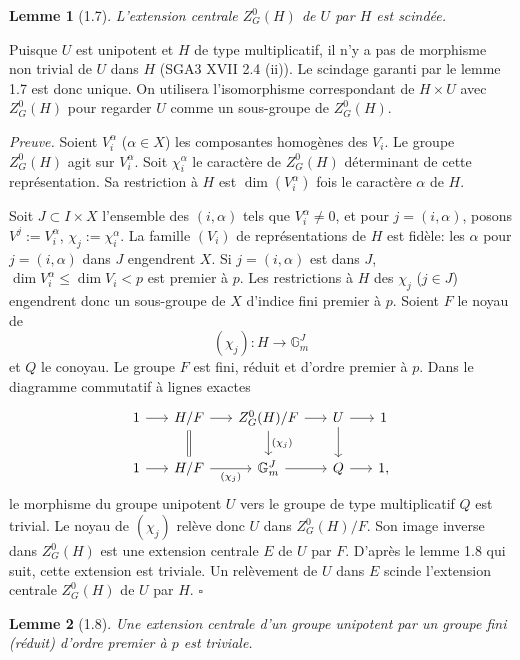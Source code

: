 \documentclass[10pt]{article}
\newcommand{\Gm}{\mathbb G_m}
\theoremstyle{deligne}
\newtheorem*{lemma*}{Lemme}
\newenvironment{proofdel}{\textit{Preuve.}}{\hfill$\square$}
\begin{document}
\begin{lemma*}[1.7]
L'extension centrale \(Z^0_G(H)\) de \(U\) par \(H\) est scindée.
\end{lemma*}

Puisque \(U\) est unipotent et \(H\) de type multiplicatif, il n'y a pas de morphisme non trivial de \(U\) dans \(H\) (SGA3 XVII 2.4 (ii)). Le scindage garanti par le lemme 1.7 est donc unique. On utilisera l'isomorphisme correspondant de \(H\times U\) avec \(Z^0_G(H)\) pour regarder \(U\) comme un sous-groupe de \(Z^0_G(H)\).

\begin{proofdel}
Soient \(V^\alpha_i\) (\(\alpha\in X\)) les composantes homogènes des \(V_i\). Le groupe \(Z^0_G(H)\) agit sur \(V^\alpha_i\). Soit \(\chi^\alpha_i\) le caractère de \(Z^0_G(H)\) déterminant de cette représentation. Sa restriction à \(H\) est \(\dim(V^\alpha_i)\) fois le caractère \(\alpha\) de \(H\).

Soit \(J\subset I\times X\) l'ensemble des \((i,\alpha)\) tels que \(V^\alpha_i\ne0\), et pour \(j=(i,\alpha)\), posons \(V^j:=V^\alpha_i\), \(\chi_j:=\chi^\alpha_i\). La famille \((V_i)\) de représentations de \(H\) est fidèle: les \(\alpha\) pour \(j=(i,\alpha)\) dans \(J\) engendrent \(X\). Si \(j=(i,\alpha)\) est dans \(J\), \(\dim V^\alpha_i\le\dim V_i<p\) est premier à \(p\). Les restrictions à \(H\) des \(\chi_j\) (\(j\in J\)) engendrent donc un sous-groupe de \(X\) d'indice fini premier à \(p\). Soient \(F\) le noyau de
\[
  (\chi_j):H\longrightarrow \Gm^J
\]
et \(Q\) le conoyau. Le groupe \(F\) est fini, réduit et d'ordre premier à \(p\). Dans le diagramme commutatif à lignes exactes
\[
\begin{tikzcd}[column sep=1.6em]
1 \arrow[r] & H/F \arrow[r] \arrow[d,equals] &
Z^0_G(H)/F \arrow[r] \arrow[d,"{(\chi_j)}"] &
U \arrow[r] \arrow[d] & 1\\
1 \arrow[r] & H/F \arrow[r,"{(\chi_j)}"'] &
\Gm^J \arrow[r] &
Q \arrow[r] & 1 ,
\end{tikzcd}
\]
le morphisme du groupe unipotent \(U\) vers le groupe de type multiplicatif \(Q\) est trivial. Le noyau de \((\chi_j)\) relève donc \(U\) dans \(Z^0_G(H)/F\). Son image inverse dans \(Z^0_G(H)\) est une extension centrale \(E\) de \(U\) par \(F\). D'après le lemme 1.8 qui suit, cette extension est triviale. Un relèvement de \(U\) dans \(E\) scinde l'extension centrale \(Z^0_G(H)\) de \(U\) par \(H\).
\end{proofdel}

\begin{lemma*}[1.8]
Une extension centrale d'un groupe unipotent par un groupe fini (réduit) d'ordre premier à \(p\) est triviale.
\end{lemma*}
\end{document}
